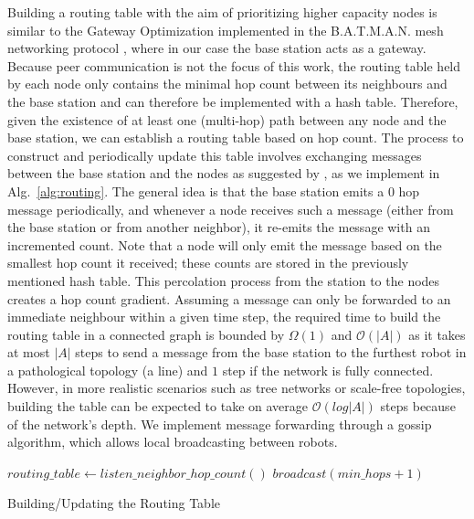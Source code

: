 Building a routing 
table with the aim of prioritizing higher capacity nodes is similar to the Gateway 
Optimization \cite{openMesh2021gateways} implemented in the \ac{B.A.T.M.A.N.} mesh networking
protocol \cite{johnson2008simple}, where in our case the base station acts as a gateway. Because peer communication is not the 
focus of this work, the routing table held by each node only contains the minimal hop count 
between its neighbours and the base station and can therefore
be implemented with a hash table. Therefore, given the existence of at least one (multi-hop) path between any node and the base station, we can establish a routing table based on hop count. The process to construct and periodically update this 
table involves exchanging messages between the base station and the nodes as suggested by 
\cite{abdullah2015detecting}, as we implement in Alg.~\ref{alg:routing}. The general idea is that the base station emits a 0 hop message periodically, and whenever a node receives such a message (either from the base station or from another neighbor), it re-emits the message with an incremented count. Note that a node will only emit the message based on the smallest hop count it received; these counts are stored in the previously mentioned hash table. This percolation process from the station to the nodes creates a hop count gradient.
Assuming a message can only be forwarded to an immediate neighbour within a given time 
step, the required time to build the routing table in a connected graph is bounded by 
$\Omega(1)$ and $\mathcal{O}(|A|)$ as it takes at most $|A|$ steps to send a message from 
the base station to the furthest robot in a pathological topology (a line) and $1$ step if 
the network is fully connected. However, in more realistic scenarios such as tree networks 
or scale-free topologies, building the table can be expected to take on average 
$\mathcal{O}(log|A|)$ steps because of the network's depth. We implement message forwarding through a gossip algorithm, which allows local broadcasting between robots.

\begin{algorithm}[htbp]
\small
\SetAlgoLined
\DontPrintSemicolon
    $routing\_table \longleftarrow listen\_neighbor\_hop\_count()$\;
    \;
    \;
    $broadcast(min\_hops + 1)$\;
\caption{Building/Updating the Routing Table}
\label{alg:routing}
\end{algorithm}

